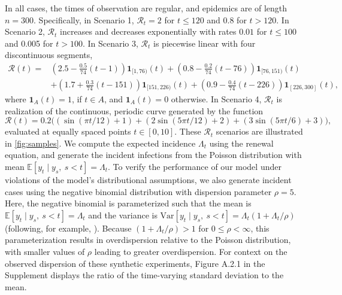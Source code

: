 \documentclass[10pt,letterpaper]{article}
\newcommand{\lr}[1]{\left(#1\right)}
\def\bbE{\mathbb{E}}
\def\calR{\mathcal{R}}
\begin{document}
In all cases, the times of observation are regular, and epidemics are of length
$n=300$. Specifically, in Scenario 1, $\calR_t = 2$ for $t\leq 120$ and 0.8 for $t>120$. In
Scenario 2, $\calR_t$ increases and decreases exponentially with rates $0.01$
for $t\leq 100$ and 0.005 for $t>100$. In Scenario 3, $\calR_t$ is piecewise linear
with four discontinuous segments, 
\begin{equation}
  \begin{split}
    \calR(t) =& \lr{2.5 - \frac{0.5}{74}\lr{t-1}} \boldsymbol{1}_{[1,76)}(t)
     + \lr{0.8 - \frac{0.2}{74}\lr{t-76}} \boldsymbol{1}_{[76,151)}(t) \\
    & + \lr{1.7 + \frac{0.3}{74}\lr{t-151}} \boldsymbol{1}_{[151,226)}(t)
       + \lr{0.9 - \frac{0.4}{74}\lr{t-226}} \boldsymbol{1}_{[226,300]}(t),
  \end{split}
\end{equation}
where $\boldsymbol{1}_{A}(t) = 1$, if $t\in A$, and $\boldsymbol{1}_{A}(t)=0$ otherwise. 
In Scenario 4, $\calR_t$ is realization of the 
continuous, periodic curve generated by the function 
\begin{equation}
  \calR(t) = 0.2 \big(\lr{\sin(\pi t/12) + 1} + \lr{2 \sin\lr{5 \pi t / 12} + 2} 
  + \lr{3 \sin(5\pi t / 6) + 3}\big),
\end{equation} 
evaluated at equally spaced points $t\in [0,10]$. These $\calR_t$ scenarios are
illustrated in \autoref{fig:samples}. We compute the expected incidence
$\Lambda_t$ using the renewal equation, and generate the incident infections
from the Poisson distribution with mean $\bbE[y_t \mid y_s,\ s<t] = \Lambda_t$.
To verify the performance of our model under violations of the model's
distributional assumptions, we also generate incident cases using the negative
binomial distribution with dispersion parameter $\rho = 5$. Here, the negative
binomial is parameterized such that the mean is
$\bbE[y_t\mid y_s,\ s<t] = \Lambda_t$ and the variance is $\textrm{Var}[y_t \mid
y_s,\ s<t] = \Lambda_t(1 +
\Lambda_t / \rho)$ (following, for example, \cite{gressani2022epilps}). Because
$(1 + \Lambda_t / \rho)> 1$ for  $0\leq\rho <\infty$, this parameterization results
in overdispersion relative to the Poisson distribution, with smaller values of
$\rho$ leading to greater overdispersion. For context on the observed dispersion
of these synthetic experiments, Figure A.2.1 in the Supplement displays the
ratio of the time-varying standard deviation to the mean. 
\end{document}
